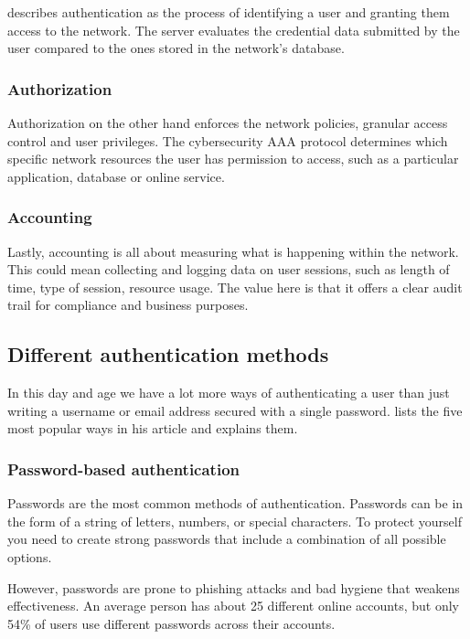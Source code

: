 \textcite{Magnusson2022} describes authentication as the process of identifying a user and granting them access to the network. The server evaluates the credential data submitted by the user compared to the ones stored in the network's database.

\subsubsection{Authorization}

Authorization on the other hand enforces the network policies, granular access control and user privileges. The cybersecurity AAA protocol determines which specific network resources the user has permission to access, such as a particular application, database or online service.

\subsubsection{Accounting}

Lastly, accounting is all about measuring what is happening within the network. This could mean collecting and logging data on user sessions, such as length of time, type of session, resource usage. The value here is that it offers a clear audit trail for compliance and business purposes.

\subsection{Different authentication methods}
\label{ch:different-authentication-methods}

In this day and age we have a lot more ways of authenticating a user than just writing a username or email address secured with a single password. \textcite{Maayan} lists the five most popular ways in his article and explains them.

\subsubsection{Password-based authentication}

Passwords are the most common methods of authentication. Passwords can be in the form of a string of letters, numbers, or special characters. To protect yourself you need to create strong passwords that include a combination of all possible options. 

However, passwords are prone to phishing attacks and bad hygiene that weakens effectiveness. An average person has about 25 different online accounts, but only 54\% of users use different passwords across their accounts. 

